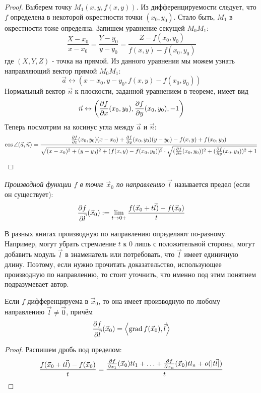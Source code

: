 \begin{proof}
	Выберем точку $M_1(x, y, f(x, y))$. Из дифференцируемости следует, что $f$ определена в некоторой окрестности точки $(x_0, y_0)$. Стало быть, $M_1$ в окрестности тоже определна. Запишем уравнение секущей $M_0 M_1$:
	\[
		\frac{X - x_0}{x - x_0} = \frac{Y - y_0}{y - y_0} = \frac{Z - f(x_0, y_0)}{f(x, y) - f(x_0, y_0)}
	\]
	где $(X, Y, Z)$ - точка на прямой. Из данного уравнения мы можем узнать направляющий вектор прямой $M_0 M_1$:
	\[
		\vec{a} \leftrightarrow (x - x_0, y - y_0, f(x, y) - f(x_0, y_0))
	\]
	Нормальный вектор $\vec{n}$ к плоскости, заданной уравнением в теореме, имеет вид
	\[
		\vec{n} \leftrightarrow \left(\frac{\partial f}{\partial x} (x_0, y_0), \frac{\partial f}{\partial y} (x_0, y_0), -1\right)
	\]
	Теперь посмотрим на косинус угла между $\vec{a}$ и $\vec{n}$:
	\[
		\cos \angle (\vec{a}, \vec{n}) = \frac{\frac{\partial f}{\partial x} (x_0, y_0)(x - x_0) + \frac{\partial f}{\partial y} (x_0, y_0)(y - y_0) - f(x, y) + f(x_0, y_0)}{\sqrt{(x - x_0)^2 + (y - y_0)^2 + (f(x, y) - f(x_0, y_0))^2} \cdot \sqrt{(\frac{\partial f}{\partial x} (x_0, y_0))^2 + (\frac{\partial f}{\partial y} (x_0, y_0))^2 + 1}}
	\]
\end{proof}

\begin{definition}
	\textit{Производной функции $f$ в точке $\vec{x}_0$ по направлению} $\vec{l}$ называется предел (если он существует):
	\[
		\frac{\partial f}{\partial \vec{l}} (\vec{x}_0) := \lim\limits_{t \to 0+} \frac{f(\vec{x}_0 + t\vec{l}) - f(\vec{x}_0)}{t}
	\]
\end{definition}

\begin{note}
	В разных книгах производную по направлению определяют по-разному. Например, могут убрать стремление $t$ к 0 лишь с положительной стороны, могут добавить модуль $\vec{l}$ в знаменатель или потребовать, что $\vec{l}$ имеет единичную длину. Поэтому, если нужно прочитать доказательство, использующее производную по направлению, то стоит уточнить, что именно под этим понятием подразумевает автор.
\end{note}

\begin{proposition}
	Если $f$ дифференцируема в $\vec{x}_0$, то она имеет производную по любому направлению $\vec{l} \neq \vec{0}$, причём
	\[
		\frac{\partial f}{\partial \vec{l}} (\vec{x}_0) = \left\langle\operatorname{grad} f(\vec{x}_0), \vec{l}\right\rangle
	\]
\end{proposition}

\begin{proof}
	Распишем дробь под пределом:
	\[
		\frac{f(\vec{x}_0 + t\vec{l}) - f(\vec{x}_0)}{t} = \frac{\frac{\partial f}{\partial x_1} (\vec{x}_0) tl_1 + \ldots + \frac{\partial f}{\partial x_n} (\vec{x}_0)tl_n + o(|t\vec{l}|)}{t}
	\]
\end{proof}

